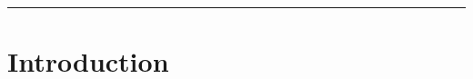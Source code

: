 \documentclass[a4paper]{article}
\begin{document}



\tableofcontents

\noindent\rule{\textwidth}{1pt}


\newpage
\section*{Introduction}

\kant[5]



\newpage 
\printbibliography
\end{document}
